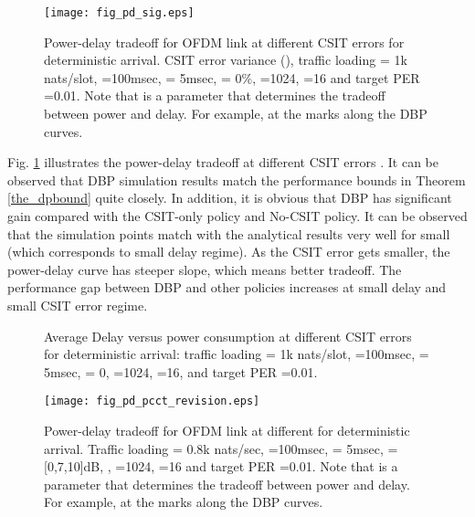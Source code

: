 \documentclass[11pt,journal, onecolumn]{./IEEEtran}
\newcommand{\black}{\color{black}}
\newcommand{\red}{\color{black}}
\begin{document}
\begin{figure}[t!]
\centering
\texttt{[image: fig\_pd\_sig.eps]}
\caption{{\red Power-delay tradeoff for OFDM link at different CSIT errors for deterministic arrival. CSIT error variance (), traffic loading  = 1k nats/slot, =100msec,  = 5msec,  = 0\%, =1024,  =16 and target PER =0.01. Note that  is a parameter that determines the tradeoff between power and delay. For example,  at the marks along the DBP curves. } \black } \label{fig_pd_sig} \black
\end{figure}

\black

Fig. \ref{fig_pd_sig} illustrates the power-delay tradeoff at different CSIT errors . It can be observed that DBP simulation results match the performance bounds in Theorem \ref{the_dpbound} quite closely. In addition, it is obvious that DBP has significant gain compared with the CSIT-only policy and No-CSIT policy. {\red It can be observed that the simulation points match with the analytical results very well for small  (which corresponds to small delay regime).} As the CSIT error  gets smaller, the power-delay curve has steeper slope, which means better tradeoff. The performance gap between DBP and other policies increases at small delay and small CSIT error regime.



\begin{figure}
\begin{center}
  \end{center}
    \caption{ \red Average Delay versus power consumption at different CSIT errors for deterministic arrival: traffic loading  =  1k nats/slot, =100msec,  = 5msec,  = 0, =1024,  =16, and target PER =0.01. }
    \label{fig_gradient} \black
\end{figure}

\black




\begin{figure}[h!]
\centering
\texttt{[image: fig\_pd\_pcct\_revision.eps]}
\caption{{\red Power-delay tradeoff for OFDM link at different  for deterministic arrival. Traffic loading  =  0.8k nats/sec, =100msec,  = 5msec,  = [0,7,10]dB, , =1024,  =16 and target PER =0.01. Note that  is a parameter that determines the tradeoff between power and delay. For example,  at the marks along the DBP curves. } \black} \label{fig_pd_pcct} \black
\end{figure}
\end{document}
